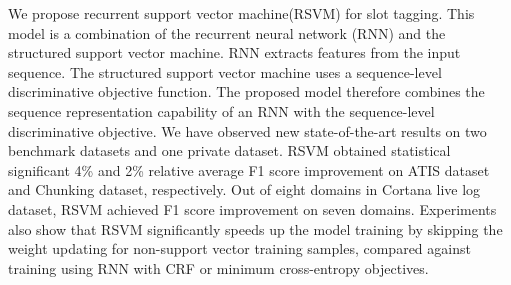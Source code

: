 We propose recurrent support vector machine(RSVM) for slot tagging. This model is a combination of the recurrent neural network (RNN) and the structured support vector machine. RNN extracts features from the input sequence. The structured support vector machine uses a sequence-level discriminative objective function. The proposed model therefore combines the sequence representation capability of an RNN with the sequence-level discriminative objective. We have observed new state-of-the-art results on two benchmark datasets and one private dataset. RSVM obtained statistical significant 4\% and 2\% relative average F1 score improvement on ATIS dataset and Chunking dataset, respectively. Out of eight domains in Cortana live log dataset, RSVM achieved F1 score improvement on seven domains. Experiments also show that RSVM significantly speeds up the model training by skipping the weight updating for non-support vector training samples, compared against training using RNN with CRF or minimum cross-entropy objectives.
